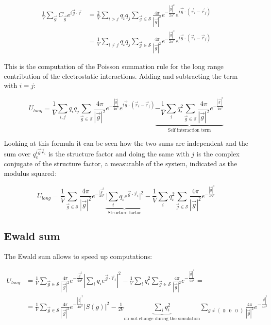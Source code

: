 	\begin{align*}
		\frac{1}{V}\sum\limits_{\vec{g}}C_{\vec{g}}e^{i\vec{g}\cdot\vec{r}} &= \frac{2}{V}\sum\limits_{i>j}q_iq_j\sum\limits_{\vec{g}\in\mathcal{S}}\frac{4\pi}{|\vec{g}|^2}e^{-\frac{|\vec{g}|^2}{2\alpha^2}}e^{i\vec{g}\cdot(\vec{r}_i-\vec{r}_j)}\\
																																				&=\frac{1}{V}\sum\limits_{i\neq j}q_iq_j\sum\limits_{\vec{g}\in\mathcal{S}}\frac{4\pi}{|\vec{g}|^2}e^{-\frac{|\vec{g}|^2}{2\alpha^2}}e^{i\vec{g}\cdot(\vec{r}_i-\vec{r}_j)}
	\end{align*}

	This is the computation of the Poisson summation rule for the long range contribution of the electrostatic interactions.
	Adding and subtracting the term with $i = j$:

	$$U_{long} = \frac{1}{V}\sum\limits_{i, j}q_iq_j\sum\limits_{\vec{g}\in\mathcal{S}}\frac{4\pi}{|\vec{g}|^2}e^{-\frac{|\vec{g}|}{4\alpha^2}}e^{i\vec{g}\cdot(\vec{r}_i-\vec{r}_j)}\underbrace{-\frac{1}{V}\sum\limits_iq_i^2\sum\limits_{\vec{g}\in\mathcal{S}}\frac{4\pi}{|\vec{g}|^2}e^{-\frac{|\vec{g}|^2}{4\alpha^2}}}_{\text{Self interaction term}}$$

	Looking at this formula it can be seen how the two sums are independent and the sum over $q_e^{i\vec{g}\vec{r}_i}$ is the structure factor and doing the same with $j$ is the complex conjugate of the structure factor, a measurable of the system, indicated as the modulus squared:

	$$U_{long} = \frac{1}{V}\sum\limits_{\vec{g}\in\mathcal{S}}\frac{4\pi}{|\vec{g}|^2}e^{-\frac{|\vec{g}^2}{4\alpha^2}}\underbrace{\biggr\vert\sum\limits_{i}q_ie^{\vec{g}\cdot\vec{r}_i}\biggr\vert^2}_{\text{Structure factor}} - \frac{1}{V}\sum\limits_iq_i^2\sum\limits_{\vec{g}\in\mathcal{S}}\frac{4\pi}{|\vec{g}|^2}e^{-\frac{|\vec{g}|^2}{4\alpha^2}}$$

	\subsection{Ewald sum}
	The Ewald sum allows to speed up computations:

	\begin{align*}
		U_{long} &= \frac{1}{V}\sum\limits_{\vec{g}\in\mathcal{S}}\frac{4\pi}{|\vec{g}|^2}e^{-\frac{|\vec{g}^2}{4\alpha^2}}|\sum\limits_{i}q_ie^{\vec{g}\cdot\vec{r}_i}|^2 - \frac{1}{V}\sum\limits_iq_i^2\sum\limits_{\vec{g}\in\mathcal{S}}\frac{4\pi}{|\vec{g}|^2}e^{-\frac{|\vec{g}|^2}{4\alpha^2}} = \\
						 &= \frac{1}{V}\sum\limits_{\vec{g}\in\mathcal{S}}\frac{4\pi}{|\vec{g}|^2}e^{-\frac{|\vec{g}|^2}{4\alpha^2}}|S(g)|^2-\frac{1}{2V}\underbrace{\sum\limits_{i}q_i^2}_{\text{do not change during the simulation}}\sum\limits_{g\neq\begin{pmatrix} 0&0&0\end{pmatrix}}\frac{4\pi}{|\vec{g}|^2}e^{-\frac{|\vec{g}|^2}{4\alpha^2}}
	\end{align*}

